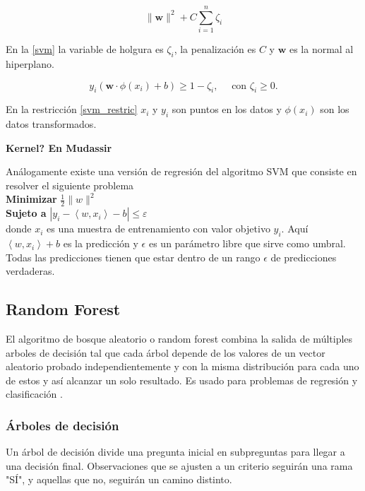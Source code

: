 \begin{equation}
	\|\mathbf{w}\|^{2}+C \sum_{i=1}^{n} \zeta_{i}
	\label{svm}
\end{equation}

En la \autoref{svm} la variable de holgura es $\zeta_{i}$, la penalización es $C$ y $\mathbf{w}$ es la normal al hiperplano.

\begin{equation}
	y_{i}\left(\mathbf{w} \cdot \phi\left(x_{i}\right)+b \right) \geq 1-\zeta_{i}, \quad \text { con } \zeta_{i} \geq 0.
	\label{svm_restric}
\end{equation}

En la restricción \ref{svm_restric} $x_i$ y $y_i$ son puntos en los datos y $\phi(x_i)$ son los datos transformados. 

\textbf{Kernel? En Mudassir}

Análogamente existe una versión de regresión del algoritmo SVM que consiste en resolver el siguiente problema\\

\textbf{Minimizar} $\frac{1}{2}\|w\|^{2}$\\

\textbf{Sujeto a} $\left|y_{i}-\left\langle w, x_{i}\right\rangle-b\right| \leq \varepsilon$\\

donde $x_i$ es una muestra de entrenamiento con valor objetivo $y_i$. Aquí $\left\langle w, x_{i}\right\rangle+b$ es la predicción y $\epsilon$ es un parámetro libre que sirve como umbral. Todas las predicciones tienen que estar dentro de un rango $\epsilon$ de predicciones verdaderas. 

\subsection{Random Forest}
El algoritmo de bosque aleatorio o random forest combina la salida de múltiples arboles de decisión tal que cada árbol depende de los valores de un vector aleatorio probado independientemente y con la misma distribución para cada uno de estos y así alcanzar un solo resultado. Es usado para problemas de regresión y clasificación \cite{WhatRandomForest2021}.

\subsubsection{Árboles de decisión}
Un árbol de decisión divide una pregunta inicial en subpreguntas para llegar a una decisión final. Observaciones que se ajusten a un criterio seguirán una rama "SÍ", y aquellas que no, seguirán un camino distinto.

